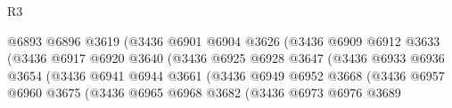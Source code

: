 \begin{lexlean}{R3}
\begin{coremodule}
                                              @6893
                                              @6896
                                              @3619
                                              (@3436
                                                @6901
                                                @6904
                                                @3626
                                                (@3436
                                                  @6909
                                                  @6912
                                                  @3633
                                                  (@3436
                                                    @6917
                                                    @6920
                                                    @3640
                                                    (@3436
                                                      @6925
                                                      @6928
                                                      @3647
                                                      (@3436
                                                        @6933
                                                        @6936
                                                        @3654
                                                        (@3436
                                                          @6941
                                                          @6944
                                                          @3661
                                                          (@3436
                                                            @6949
                                                            @6952
                                                            @3668
                                                            (@3436
                                                              @6957
                                                              @6960
                                                              @3675
                                                              (@3436
                                                                @6965
                                                                @6968
                                                                @3682
                                                                (@3436
                                                                  @6973
                                                                  @6976
                                                                  @3689

\end{coremodule}
\end{lexlean}
